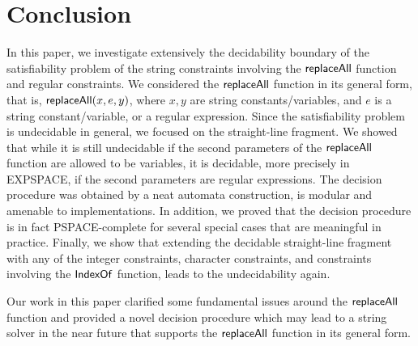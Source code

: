 
\section{Conclusion}

In this paper, we investigate extensively the decidability boundary of the satisfiability problem of the string constraints involving the $\mathsf{replaceAll}$ function and regular constraints. We considered the $\mathsf{replaceAll}$ function in its general form, that is, $\mathsf{replaceAll}(x, e, y)$, where $x,y$ are string constants/variables, and $e$ is a string constant/variable, or a regular expression. Since the satisfiability problem is undecidable in general, we focused on the straight-line fragment. We showed that while it is still undecidable if the second parameters of the $\mathsf{replaceAll}$ function are allowed to be variables, it is decidable, more precisely in EXPSPACE, if the second parameters are regular expressions. The decision procedure was obtained by a neat automata construction, is modular and amenable to implementations. In addition, we proved that the decision procedure is in fact PSPACE-complete for several special cases that are meaningful in practice. Finally, we show that extending the decidable straight-line fragment with any of the integer constraints, character constraints, and constraints involving the $\mathsf{IndexOf}$ function, leads to the undecidability again. 

Our work in this paper clarified some fundamental issues around the $\mathsf{replaceAll}$ function and provided a novel decision procedure which may lead to a string  solver in the near future that supports the $\mathsf{replaceAll}$ function in its general form.